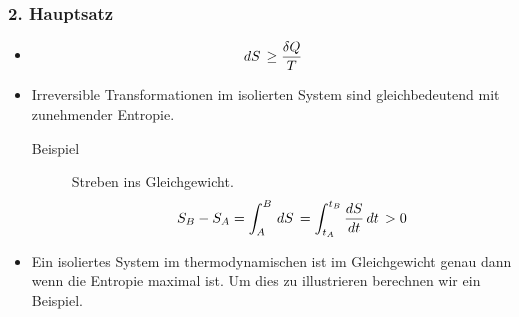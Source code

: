 \subsubsection*{2. Hauptsatz}
\begin{itemize}
  \item %
    \begin{align*}
      \,dS\, \ge 
      \frac{\delta Q}{T}
    \end{align*}
  \item 
    Irreversible Transformationen im isolierten System sind gleichbedeutend
    mit zunehmender Entropie.
    \begin{description}
      \item[Beispiel] Streben ins Gleichgewicht.
        \begin{align*}
          S_B - S_A = \int_{A}^{B} \,dS\, = \int_{t_A}^{t_B} \frac{d{S}}{d{t}} \,dt\,  > 0
        \end{align*}
    \end{description}
  \item Ein isoliertes System im thermodynamischen ist im Gleichgewicht
    genau dann wenn die Entropie maximal ist. Um dies zu illustrieren
    berechnen wir ein Beispiel.
\end{itemize}
